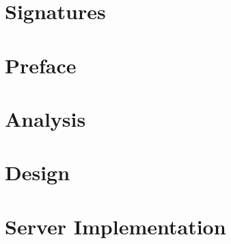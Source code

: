 






\thispagestyle{empty}
\cleardoublepage


\chapter*{Signatures}


\newpage
\thispagestyle{empty}
\mbox{}

\chapter*{Preface}
\thispagestyle{empty}


\newpage
\thispagestyle{empty}
\mbox{}



\newpage
\thispagestyle{empty}
\mbox{}

\newpage
\thispagestyle{empty}
\mbox{}

\newcommand{\appname}{Dishcover}

\setcounter{secnumdepth}{3}
\setcounter{tocdepth}{1}

\tableofcontents*

\acresetall %


\chapter{Analysis}\label{chap:intro}







\chapter{Design}\label{chap:design}








\chapter{Server Implementation}\label{chap:serverimplementation}



